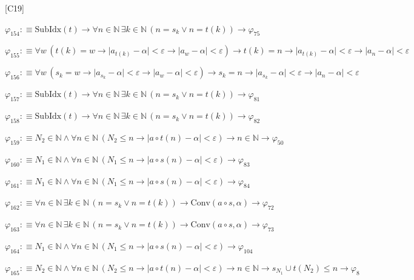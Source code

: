 \begin{fullproof}{[C19]}
\begin{abbrevlist}
\item $\varphi_{154} :\equiv \mathrm{SubIdx}(t) \to \forall n \in \mathbb{N}\,\exists k \in \mathbb{N}\,(n = s_{k} \lor n = t(k)) \to \varphi_{75}$
\item $\varphi_{155} :\equiv \forall w\,(t(k) = w \to \lvert a_{t(k)} - \alpha \rvert < \varepsilon \to \lvert a_{w} - \alpha \rvert < \varepsilon) \to t(k) = n \to \lvert a_{t(k)} - \alpha \rvert < \varepsilon \to \lvert a_{n} - \alpha \rvert < \varepsilon$
\item $\varphi_{156} :\equiv \forall w\,(s_{k} = w \to \lvert a_{s_{k}} - \alpha \rvert < \varepsilon \to \lvert a_{w} - \alpha \rvert < \varepsilon) \to s_{k} = n \to \lvert a_{s_{k}} - \alpha \rvert < \varepsilon \to \lvert a_{n} - \alpha \rvert < \varepsilon$
\item $\varphi_{157} :\equiv \mathrm{SubIdx}(t) \to \forall n \in \mathbb{N}\,\exists k \in \mathbb{N}\,(n = s_{k} \lor n = t(k)) \to \varphi_{81}$
\item $\varphi_{158} :\equiv \mathrm{SubIdx}(t) \to \forall n \in \mathbb{N}\,\exists k \in \mathbb{N}\,(n = s_{k} \lor n = t(k)) \to \varphi_{82}$
\item $\varphi_{159} :\equiv N_{2} \in \mathbb{N} \land \forall n \in \mathbb{N}\,(N_{2} \leq n \to \lvert a \circ t(n) - \alpha \rvert < \varepsilon) \to n \in \mathbb{N} \to \varphi_{50}$
\item $\varphi_{160} :\equiv N_{1} \in \mathbb{N} \land \forall n \in \mathbb{N}\,(N_{1} \leq n \to \lvert a \circ s(n) - \alpha \rvert < \varepsilon) \to \varphi_{83}$
\item $\varphi_{161} :\equiv N_{1} \in \mathbb{N} \land \forall n \in \mathbb{N}\,(N_{1} \leq n \to \lvert a \circ s(n) - \alpha \rvert < \varepsilon) \to \varphi_{84}$
\item $\varphi_{162} :\equiv \forall n \in \mathbb{N}\,\exists k \in \mathbb{N}\,(n = s_{k} \lor n = t(k)) \to \mathrm{Conv}(a \circ s,\alpha) \to \varphi_{72}$
\item $\varphi_{163} :\equiv \forall n \in \mathbb{N}\,\exists k \in \mathbb{N}\,(n = s_{k} \lor n = t(k)) \to \mathrm{Conv}(a \circ s,\alpha) \to \varphi_{73}$
\item $\varphi_{164} :\equiv N_{1} \in \mathbb{N} \land \forall n \in \mathbb{N}\,(N_{1} \leq n \to \lvert a \circ s(n) - \alpha \rvert < \varepsilon) \to \varphi_{104}$
\item $\varphi_{165} :\equiv N_{2} \in \mathbb{N} \land \forall n \in \mathbb{N}\,(N_{2} \leq n \to \lvert a \circ t(n) - \alpha \rvert < \varepsilon) \to n \in \mathbb{N} \to s_{N_{1}} \cup t(N_{2}) \leq n \to \varphi_{8}$

\end{abbrevlist}
\end{fullproof}
